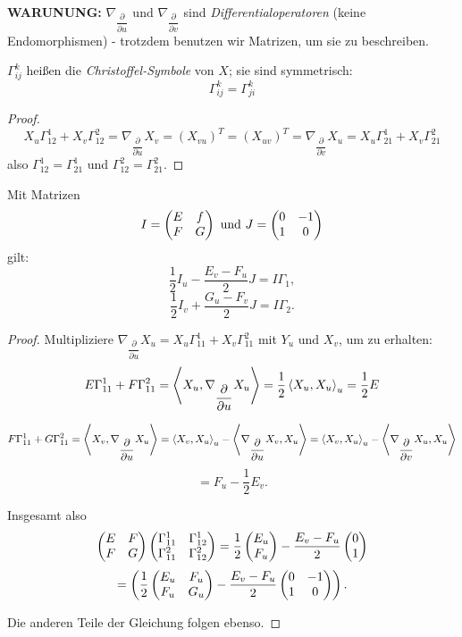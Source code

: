 	\begin{remark}
		\textbf{WARUNUNG:} $ \nabla_{\dfrac{\partial}{\partial u}} $ und $ \nabla_{\dfrac{\partial}{\partial v}} $ sind \emph{Differentialoperatoren} (keine Endomorphismen) - trotzdem benutzen wir Matrizen, um sie zu beschreiben.
	\end{remark}

\begin{lemma, definition}
	
	$\Gamma_{ij}^k$ heißen die \emph{Christoffel-Symbole} von $ X $; sie sind symmetrisch: 
		\[ \Gamma_{ij}^k = \Gamma_{ji}^k \]
	
\end{lemma, definition}

\begin{proof}
	
		\[ X_u\Gamma_{12}^1 + X_v \Gamma_{12}^2 = \nabla_{\dfrac{\partial}{\partial u}}X_v = \left( X_{vu} \right)^T = \left( X_{uv} \right)^T = \nabla_{\dfrac{\partial}{\partial v}}X_u = X_u\Gamma_{21}^1 + X_v\Gamma_{21}^2   \]
	also $ \Gamma_{12}^1 = \Gamma_{21}^1 $ und $ \Gamma_{12}^2 = \Gamma_{21}^2 $.
\end{proof}

\begin{theorem}
	
	Mit Matrizen 
		\[ I = \begin{pmatrix} E &f \\ F &G \end{pmatrix} \text{ und } J = \begin{pmatrix} 0 &-1 \\ 1 & 0  \end{pmatrix} \]
	gilt: 
		\[ \frac12 I_u - \frac{E_v - F_u}{2}J = I\Gamma_1, \]
		\[ \frac12 I_v + \frac{G_u - F_v}{2}J = I\Gamma_2. \]
		
\end{theorem}

\begin{proof}
	
	Multipliziere $ \nabla_{\dfrac{\partial}{\partial u}}X_u = X_u\Gamma_{11}^1 + X_v\Gamma_{11}^2 $ mit $ Y_u $ und $ X_v $, um zu erhalten:
		\[ E \Gamma_{11}^1 + F \Gamma_{11}^2 = \left \langle X_u, \nabla_{\dfrac{\partial}{\partial u}}X_u \right\rangle = \frac12 \left \langle X_u,X_u \right\rangle_u = \frac12 E \]
	
		\[ F\Gamma_{11}^1 + G \Gamma_{11}^2 = \left \langle X_v, \nabla_{\dfrac{\partial}{\partial u}}X_u \right\rangle = \left \langle X_v,X_u \right\rangle_u - \left \langle \nabla_{\dfrac{\partial}{\partial u}}X_v,X_u \right\rangle = \left \langle X_v,X_u \right\rangle_u - \left \langle \nabla_{\dfrac{\partial}{\partial v}}X_u,X_u \right\rangle \]
		\[ = F_u - \frac12 E_v. \]
	
	Insgesamt also
		\[ \begin{pmatrix} E &F \\F &G \end{pmatrix} \begin{pmatrix} \Gamma_{11}^1 & \Gamma_{12}^1 \\ \Gamma_{11}^2 & \Gamma_{12}^2 \end{pmatrix} = \frac12 \begin{pmatrix} E_u \\ F_u \end{pmatrix} - \dfrac{E_v - F_u}{2} \begin{pmatrix} 0 \\ 1 \end{pmatrix} \]
		\[ = \left( \frac12 \begin{pmatrix} E_u & F_u \\ F_u & G_u \end{pmatrix} - \dfrac{E_v - F_u}{2} \begin{pmatrix} 0 &-1 \\ 1 & 0  \end{pmatrix} \right).  \]
	
	Die anderen Teile der Gleichung  folgen ebenso.
	
\end{proof}

